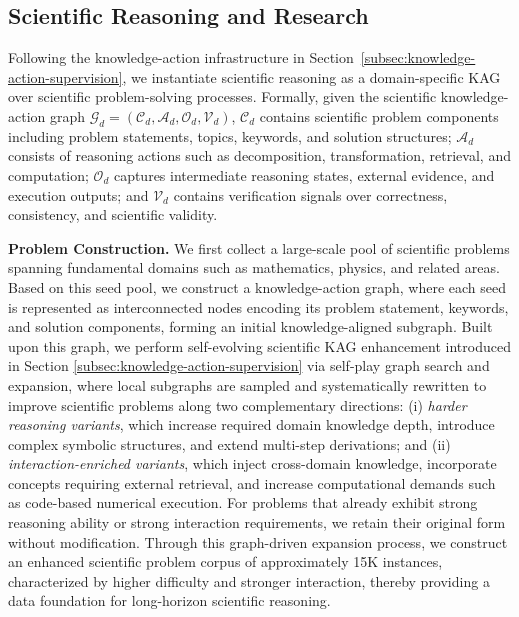 \subsection{Scientific Reasoning and Research}
\label{sec:science-data-pipeline}
Following the knowledge-action infrastructure in Section~\ref{subsec:knowledge-action-supervision}, we instantiate scientific reasoning as a domain-specific KAG over scientific problem-solving processes. Formally, given the scientific knowledge-action graph $\mathcal{G}_d = (\mathcal{C}_d, \mathcal{A}_d, \mathcal{O}_d, \mathcal{V}_d)$,  $\mathcal{C}_d$ contains scientific problem components including problem statements, topics, keywords, and solution structures; $\mathcal{A}_d$ consists of reasoning actions such as decomposition, transformation, retrieval, and computation; $\mathcal{O}_d$ captures intermediate reasoning states, external evidence, and execution outputs; and $\mathcal{V}_d$ contains verification signals over correctness, consistency, and scientific validity.

\textbf{Problem Construction.} We first collect a large-scale pool of scientific problems spanning fundamental domains such as mathematics, physics, and related areas. Based on this seed pool, we construct a knowledge-action graph, where each seed is represented as interconnected nodes encoding its problem statement, keywords, and solution components, forming an initial knowledge-aligned subgraph. Built upon this graph, we perform self-evolving scientific KAG enhancement introduced in Section \ref{subsec:knowledge-action-supervision} via self-play graph search and expansion, where local subgraphs are sampled and systematically rewritten to improve scientific problems along two complementary directions: (i) \emph{harder reasoning variants}, which increase required domain knowledge depth, introduce complex symbolic structures, and extend multi-step derivations; and (ii) \emph{interaction-enriched variants}, which inject cross-domain knowledge, incorporate concepts requiring external retrieval, and increase computational demands such as code-based numerical execution. For problems that already exhibit strong reasoning ability or strong interaction requirements, we retain their original form without modification. Through this graph-driven expansion process, we construct an enhanced scientific problem corpus of approximately 15K instances, characterized by higher difficulty and stronger interaction, thereby providing a data foundation for long-horizon scientific reasoning.


